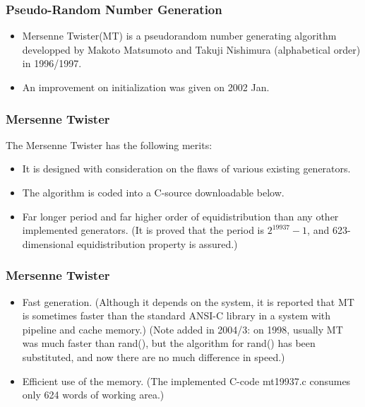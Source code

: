 \documentclass[MAIN.tex]{subfiles}
\begin{document}
		
\begin{frame}[fragile]
	\frametitle{Pseudo-Random Number Generation}
	\begin{itemize}
	\item Mersenne Twister(MT) is a pseudorandom number generating algorithm developped by Makoto Matsumoto and Takuji Nishimura (alphabetical order) in 1996/1997. 
	\item An improvement on initialization was given on 2002 Jan. 
\end{itemize}
\end{frame}
\begin{frame}
	
\frametitle{Mersenne Twister}	
The Mersenne Twister  has the following merits:

\begin{itemize}
\item It is designed with consideration on the flaws of various existing generators.
\item The algorithm is coded into a C-source downloadable below.
\item Far longer period and far higher order of equidistribution than any other implemented generators. (It is proved that the period is $2^19937-1$, and 623-dimensional equidistribution property is assured.)
\end{itemize}
\end{frame}
\begin{frame}
	
	\frametitle{Mersenne Twister}
\begin{itemize}
\item Fast generation. (Although it depends on the system, it is reported that MT is sometimes faster than the standard ANSI-C library in a system with pipeline and cache memory.) (Note added in 2004/3: on 1998, usually MT was much faster than rand(), but the algorithm for rand() has been substituted, and now there are no much difference in speed.)
\item Efficient use of the memory. (The implemented C-code mt19937.c consumes only 624 words of working area.)
\end{itemize}	
\end{frame}
\end{document}
